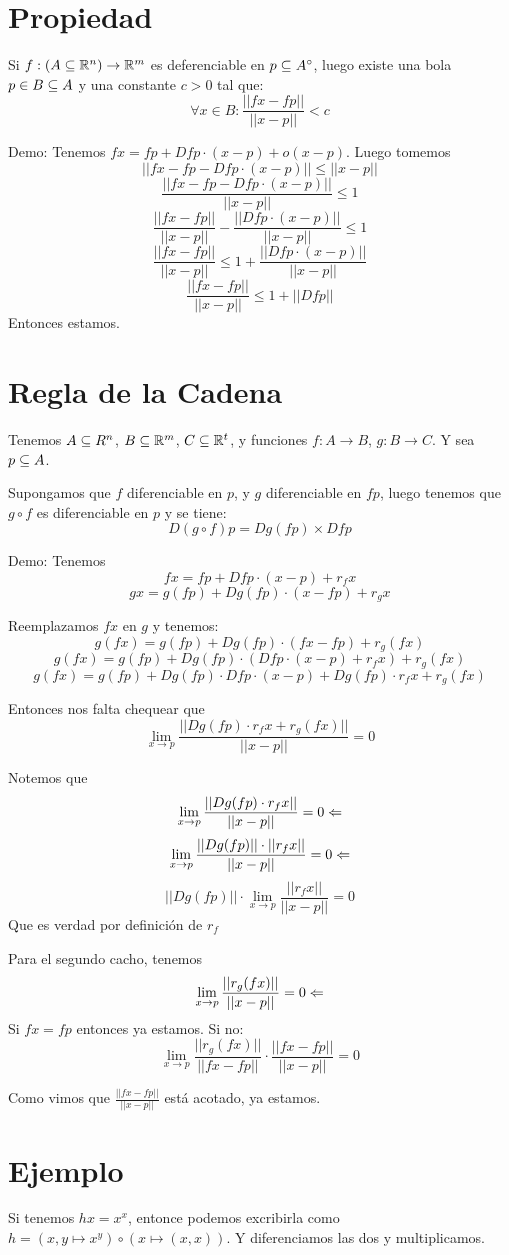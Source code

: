 \documentclass{article}
\begin{document}
\section*{Propiedad}
Si $f : (A \subseteq \mathbb{R}^n) \to \mathbb{R}^m$ es deferenciable en $p \subseteq A^\circ$, luego existe una bola $p \in B \subseteq A$ y una constante $c > 0$ tal que:
\[
	\forall x \in B : \frac{||fx - fp||}{||x-p||} < c
\]

Demo: Tenemos $fx = fp + Dfp \cdot (x-p) + o(x-p)$. Luego tomemos
\[||fx - fp - Dfp \cdot (x-p)|| \leq ||x-p||\]
\[\frac{||fx - fp - Dfp \cdot (x-p)||}{||x-p||} \leq 1\]
\[\frac{||fx - fp||}{||x-p||} - \frac{||Dfp \cdot (x-p)||}{||x-p||} \leq 1\]
\[\frac{||fx - fp||}{||x-p||} \leq 1+ \frac{||Dfp \cdot (x-p)||}{||x-p||}\]
\[\frac{||fx - fp||}{||x-p||} \leq 1+ ||Dfp||\]
Entonces estamos.

\section*{Regla de la Cadena}
Tenemos $A \subseteq R^n$, $B \subseteq \mathbb{R}^m$, $C \subseteq \mathbb{R}^t$, y funciones $f : A \to B$, $g : B \to C$. Y sea $p \subseteq A$.

Supongamos que $f$ diferenciable en $p$, y $g$ diferenciable en $fp$, luego tenemos que $g \circ f$ es diferenciable en $p$ y se tiene:
\[D(g \circ f)p = Dg(fp) \times Dfp\]

Demo:
Tenemos
\[fx = fp + Dfp \cdot (x-p) + r_fx\]
\[gx = g(fp) + Dg(fp) \cdot (x-fp) + r_gx\]

Reemplazamos $fx$ en $g$ y tenemos:
\[g(fx) = g(fp) + Dg(fp) \cdot (fx-fp) + r_g(fx)\]
\[g(fx) = g(fp) + Dg(fp) \cdot (Dfp \cdot (x-p) + r_fx) + r_g(fx)\]
\[g(fx) = g(fp) + Dg(fp) \cdot Dfp \cdot (x-p) + Dg(fp) \cdot r_fx + r_g(fx)\]

Entonces nos falta chequear que
\[\lim_{x \to p} \frac{||Dg(fp) \cdot r_fx + r_g(fx)||}{||x-p||} = 0\]

Notemos que
\[\lim_{x \to p} \frac{||Dg(fp) \cdot r_fx||}{||x-p||} = 0 \Leftarrow\]
\[\lim_{x \to p} \frac{||Dg(fp)|| \cdot ||r_fx||}{||x-p||} = 0 \Leftarrow\]
\[||Dg(fp)|| \cdot\lim_{x \to p} \frac{ ||r_fx||}{||x-p||} = 0\]
Que es verdad por definición de $r_f$

Para el segundo cacho, tenemos
\[\lim_{x \to p} \frac{||r_g(fx)||}{||x-p||} = 0 \Leftarrow\]
Si $fx = fp$ entonces ya estamos. Si no:
\[\lim_{x \to p} \frac{||r_g(fx)||}{||fx-fp||} \cdot \frac{||fx-fp||}{||x-p||} = 0\]

Como vimos que $\frac{||fx-fp||}{||x-p||}$ está acotado, ya estamos.

\section*{Ejemplo}
Si tenemos $hx = x^x$, entonce podemos excribirla como $h = (x,y \mapsto x^y) \circ (x \mapsto (x,x))$. Y diferenciamos las dos y multiplicamos.
\end{document}
